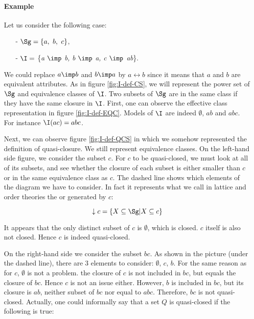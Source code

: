 \paragraph{Example} Let us consider the following case:
\begin{itemize}
	\item[-] $\Sg = \{a, \ b, \ c \}$,
	\item[-] $\I = $ \{\textit{a $\imp$ b, b $\imp$ a, c $\imp$ ab}\}.
\end{itemize}
We could replace $a \imp b$ and $b \imp a$ by $ a \longleftrightarrow b$ since it means that $a$ and $b$ are equivalent attributes. As in figure \ref{fig:I-def-CS}, we will represent the power set of $\Sg$ and 
equivalence classes of $\I$. Two subsets of $\Sg$ are in the same class if they
have the same closure in $\I$. First, one can observe the effective class 
representation in figure \ref{fig:I-def-EQC}. Models of $\I$ are indeed 
$\emptyset$, $ab$ and $abc$. For instance $\I(ac) = abc$.

\vspace{1.2em}

\begin{figure}[ht]
	
\end{figure}

Next, we can observe figure \ref{fig:I-def-QCS} in which we somehow represented 
the definition of quasi-closure. We still represent equivalence classes. On
the left-hand side figure, we consider the subset $c$. For $c$ to be 
quasi-closed, we must look at all of its subsets, and see whether the closure
of each subset is either smaller than $c$ or in the same equivalence class
as $c$. The dashed line shows which elements of the diagram we have to 
consider. In fact it represents what we call in lattice and order theories the 
 or  generated by $c$:

	\[ \downarrow c = \{ X \subseteq \Sg | X \subseteq c \} \] 

It appears that the only distinct subset of $c$ is $\emptyset$, which is 
closed. $c$ itself is also not closed. Hence $c$ is indeed quasi-closed. 

\vspace{1.2em}

\begin{figure}[ht]
	
\end{figure}

On the right-hand side we consider the subset $bc$. As shown in the picture 
(under the dashed line), there are 3 elements to consider: $\emptyset$, $c$, 
$b$. For the same reason as for $c$, $\emptyset$ is not a problem. the closure
of $c$ is not included in $bc$, but equals the closure of $bc$. Hence $c$ is
not an issue either. However, $b$ is included in $bc$, but its closure is $ab$,
neither subset of $bc$ nor equal to $abc$. Therefore, $bc$ is not quasi-closed.
Actually, one could informally say that a set $Q$ is quasi-closed if the 
following is true:

